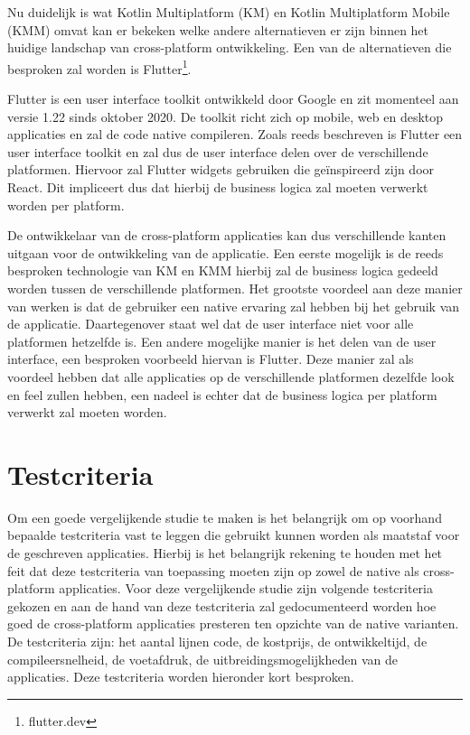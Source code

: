 Nu duidelijk is wat Kotlin Multiplatform (KM) en Kotlin Multiplatform Mobile (KMM) omvat kan er bekeken welke andere alternatieven er zijn binnen het huidige landschap van cross-platform ontwikkeling. Een van de alternatieven die besproken zal worden is Flutter\footnote{flutter.dev}.

Flutter is een user interface toolkit ontwikkeld door Google en zit momenteel aan versie 1.22 sinds oktober 2020.\autocite{Sells2020} De toolkit richt zich op mobile, web en desktop applicaties en zal de code native compileren. Zoals reeds beschreven is Flutter een user interface toolkit en zal dus de user interface delen over de verschillende platformen. Hiervoor zal Flutter widgets gebruiken die geïnspireerd zijn door React.\autocite{FlutterWidgets} Dit impliceert dus dat hierbij de business logica zal moeten verwerkt worden per platform.

De ontwikkelaar van de cross-platform applicaties kan dus verschillende kanten uitgaan voor de ontwikkeling van de applicatie. Een eerste mogelijk is de reeds besproken technologie van KM en KMM hierbij zal de business logica gedeeld worden tussen de verschillende platformen. Het grootste voordeel aan deze manier van werken is dat de gebruiker een native ervaring zal hebben bij het gebruik van de applicatie. Daartegenover staat wel dat de user interface niet voor alle platformen hetzelfde is. Een andere mogelijke manier is het delen van de user interface, een besproken voorbeeld hiervan is Flutter. Deze manier zal als voordeel hebben dat alle applicaties op de verschillende platformen dezelfde look en feel zullen hebben, een nadeel is echter dat de business logica per platform verwerkt zal moeten worden.


\section{Testcriteria}
\label{sec:SVZtestcriteria}


Om een goede vergelijkende studie te maken is het belangrijk om op voorhand bepaalde testcriteria vast te leggen die gebruikt kunnen worden als maatstaf voor de geschreven applicaties. Hierbij is het belangrijk rekening te houden met het feit dat deze testcriteria van toepassing moeten zijn op zowel de native als cross-platform applicaties. Voor deze vergelijkende studie zijn volgende testcriteria gekozen en aan de hand van deze testcriteria zal gedocumenteerd worden hoe goed de cross-platform applicaties presteren ten opzichte van de native varianten. De testcriteria zijn: het aantal lijnen code, de kostprijs, de ontwikkeltijd, de compileersnelheid, de voetafdruk, de uitbreidingsmogelijkheden van de applicaties. Deze testcriteria worden hieronder kort besproken. 


